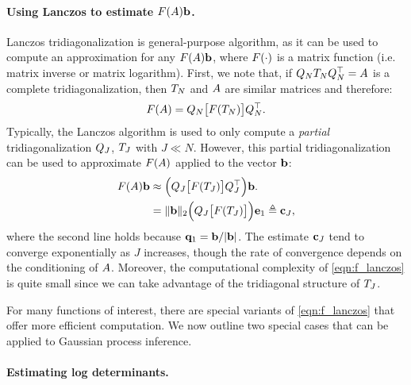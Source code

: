 \paragraph{Using Lanczos to estimate $F (A) \mathbf{b}$.}
Lanczos tridiagonalization is general-purpose algorithm, as it can be used to compute an approximation for any $F(A) \mathbf{b}$, where $F( \cdot )$ is a matrix function (i.e. matrix inverse or matrix logarithm).
First, we note that, if $Q_N T_N Q_N^\top = A$ is a complete tridiagonalization, then $T_N$ and $A$ are similar matrices and therefore:
\begin{equation}
  F ( A ) = Q_N \bigl[ F ( T_N ) \bigr] Q_N^\top.
  \label{eqn:f_tridiagonal}
\end{equation}
%
%
Typically, the Lanczos algorithm is used to only compute a \emph{partial} tridiagonalization $Q_J$, $T_J$ with $J \ll N$.
However, this partial tridiagonalization can be used to approximate $F ( A )$ applied to the vector $\mathbf{b}$:
%
\begin{align}
  F ( A ) \mathbf{b}
  &\approx \Bigl( Q_J \bigl[ F ( T_J ) \bigr] Q_J^\top \Bigr) \mathbf{b}.
  \nonumber \\
  &= \Vert \mathbf{b} \Vert_2 \Bigl( Q_J \bigl[ F ( T_J ) \bigr] \Bigr) \mathbf{e}_1
  \triangleq \mathbf{c}_J,
  \label{eqn:f_lanczos}
\end{align}
%
where the second line holds because $\mathbf{q}_1 = \mathbf{b} / \vert \mathbf{b} \vert$.
The estimate $\mathbf{c}_J$ tend to converge exponentially as $J$ increases, though the rate of convergence depends on the conditioning of $A$.
Moreover, the computational complexity of \cref{eqn:f_lanczos} is quite small since we can take advantage of the tridiagonal structure of $T_J$.

For many functions of interest, there are special variants of \cref{eqn:f_lanczos} that offer more efficient computation.
We now outline two special cases that can be applied to Gaussian process inference.

\paragraph{Estimating log determinants.}

